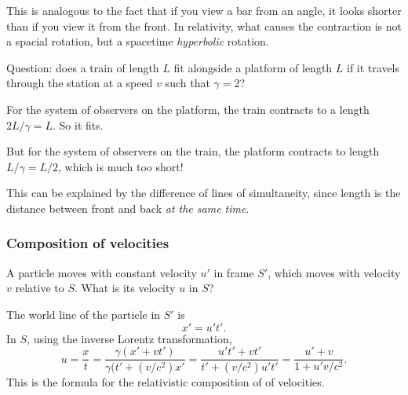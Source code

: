 \documentclass[a4paper]{article}
\begin{document}
This is analogous to the fact that if you view a bar from an angle, it looks shorter than if you view it from the front. In relativity, what causes the contraction is not a spacial rotation, but a spacetime \emph{hyperbolic} rotation.

Question: does a train of length $L$ fit alongside a platform of length $L$ if it travels through the station at a speed $v$ such that $\gamma = 2$?

For the system of observers on the platform, the train contracts to a length $2L/\gamma = L$. So it fits.

But for the system of observers on the train, the platform contracts to length $L/\gamma = L/2$, which is much too short!

This can be explained by the difference of lines of simultaneity, since length is the distance between front and back \emph{at the same time}.
\begin{center}
\end{center}

\subsubsection*{Composition of velocities}
A particle moves with constant velocity $u'$ in frame $S'$, which moves with velocity $v$ relative to $S$. What is its velocity $u$ in $S$?

The world line of the particle in $S'$ is
\[
  x' = u't'.
\]
In $S$, using the inverse Lorentz transformation, 
\[
  u = \frac{x}{t} = \frac{\gamma(x' + vt')}{\gamma(t' + (v/c^2) x'} = \frac{u't' + vt'}{t' + (v/c^2)u't'} = \frac{u' + v}{1 + u'v/c^2}.
\]
This is the formula for the relativistic composition of of velocities. 
\end{document}
